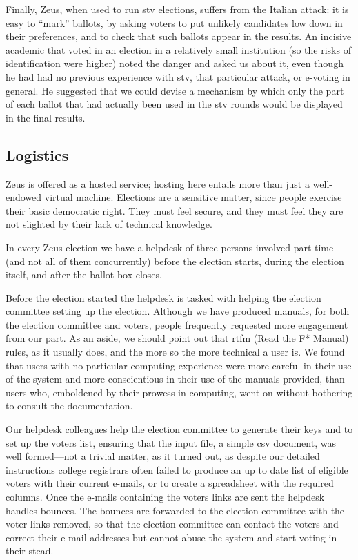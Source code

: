 \documentclass[jets]{usenixjournal}
\begin{document}
Finally, Zeus, when used to run {\sc stv} elections, suffers from the
Italian attack: it is easy to ``mark'' ballots, by asking voters to
put unlikely candidates low down in their preferences, and to check
that such ballots appear in the results. An incisive academic that
voted in an election in a relatively small institution (so the risks
of identification were higher) noted the danger and asked us about it,
even though he had had no previous experience with {\sc stv}, that
particular attack, or e-voting in general. He suggested that we could
devise a mechanism by which only the part of each ballot that had
actually been used in the {\sc stv} rounds would be displayed in the
final results. 

\subsection{Logistics}
\label{ssec:logistics}

Zeus is offered as a hosted service; hosting here entails more than
just a well-endowed virtual machine. Elections are a sensitive matter,
since people exercise their basic democratic right. They must feel
secure, and they must feel they are not slighted by their lack of
technical knowledge.

In every Zeus election we have a helpdesk of three persons involved
part time (and not all of them concurrently) before the election
starts, during the election itself, and after the ballot box closes.

Before the election started the helpdesk is tasked with helping the
election committee setting up the election. Although we have produced
manuals, for both the election committee and voters, people frequently
requested more engagement from our part. As an aside, we should point
out that {\sc rtfm} (Read the F* Manual) rules, as it usually does,
and the more so the more technical a user is. We found that users with
no particular computing experience were more careful in their use of
the system and more conscientious in their use of the manuals
provided, than users who, emboldened by their prowess in computing,
went on without bothering to consult the documentation.

Our helpdesk colleagues help the election committee to generate
their keys and to set up the voters list, ensuring that the input
file, a simple {\sc csv} document, was well formed---not a trivial
matter, as it turned out, as despite our detailed instructions college
registrars often failed to produce an up to date list of eligible
voters with their current e-mails, or to create a spreadsheet with the
required columns. Once the e-mails containing the
voters links are sent the helpdesk handles bounces. The bounces
are forwarded to the election committee with the voter links removed,
so that the election committee can contact the voters and correct
their e-mail addresses but cannot abuse the system and start voting in
their stead. 
\end{document}

